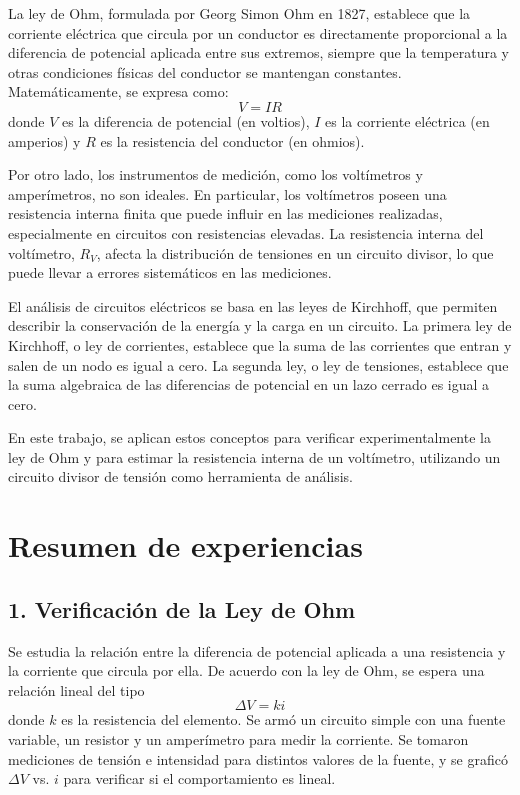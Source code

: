 \documentclass[11pt]{article}
\begin{document}
La ley de Ohm, formulada por Georg Simon Ohm en 1827, establece que la corriente eléctrica que circula por un conductor es directamente proporcional a la diferencia de potencial aplicada entre sus extremos, siempre que la temperatura y otras condiciones físicas del conductor se mantengan constantes. Matemáticamente, se expresa como:
\begin{equation}
V = I R
\label{eq:ley-ohm}
\end{equation}
donde \( V \) es la diferencia de potencial (en voltios), \( I \) es la corriente eléctrica (en amperios) y \( R \) es la resistencia del conductor (en ohmios).

Por otro lado, los instrumentos de medición, como los voltímetros y amperímetros, no son ideales. En particular, los voltímetros poseen una resistencia interna finita que puede influir en las mediciones realizadas, especialmente en circuitos con resistencias elevadas. La resistencia interna del voltímetro, \( R_V \), afecta la distribución de tensiones en un circuito divisor, lo que puede llevar a errores sistemáticos en las mediciones.

El análisis de circuitos eléctricos se basa en las leyes de Kirchhoff, que permiten describir la conservación de la energía y la carga en un circuito. La primera ley de Kirchhoff, o ley de corrientes, establece que la suma de las corrientes que entran y salen de un nodo es igual a cero. La segunda ley, o ley de tensiones, establece que la suma algebraica de las diferencias de potencial en un lazo cerrado es igual a cero.

En este trabajo, se aplican estos conceptos para verificar experimentalmente la ley de Ohm y para estimar la resistencia interna de un voltímetro, utilizando un circuito divisor de tensión como herramienta de análisis.


\section*{Resumen de experiencias}

\subsection*{1. Verificación de la Ley de Ohm}

Se estudia la relación entre la diferencia de potencial aplicada a una resistencia y la corriente que circula por ella. De acuerdo con la ley de Ohm, se espera una relación lineal del tipo
\[
\Delta V = k i
\]
donde \( k \) es la resistencia del elemento. Se armó un circuito simple con una fuente variable, un resistor y un amperímetro para medir la corriente. Se tomaron mediciones de tensión e intensidad para distintos valores de la fuente, y se graficó \( \Delta V \) vs. \( i \) para verificar si el comportamiento es lineal.
\end{document}
